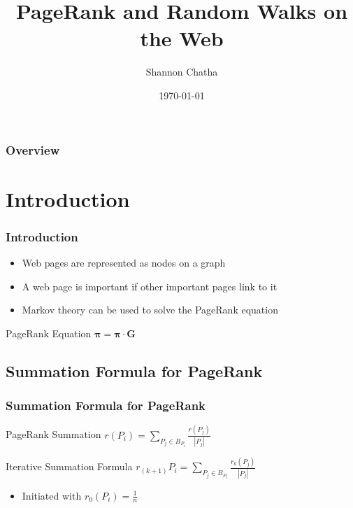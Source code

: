\documentclass{beamer}
\title[PageRank]{PageRank and Random Walks on the Web}
\author{Shannon Chatha}
\date{\today}
\begin{document}
\begin{frame}
\titlepage
\end{frame}
\begin{frame}
\frametitle{Overview}
\tableofcontents
\end{frame}


\section{Introduction}

\begin{frame}
\frametitle{Introduction}
\begin{itemize}
\item Web pages are represented as nodes on a graph
\item A web page is important if other important pages link to it
\item Markov theory can be used to solve the PageRank equation
\end{itemize}
\begin{block}{PageRank Equation}
$\boldsymbol{\pi} = \boldsymbol{\pi} \cdot \textbf{G}$
\end{block}
\end{frame}
\subsection{Summation Formula for PageRank}
\begin{frame}
\frametitle{Summation Formula for PageRank}
\begin{block}{PageRank Summation}
$r(P_i) = \displaystyle \sum_{P_j\in B_{P_i }} \frac{r(P_j)}{|P_j|} $
\end{block}
\begin{block}{Iterative Summation Formula}
$r_{(k+1)}P_i = \displaystyle \sum_{P_j\in B_{P_i }}\frac{r_k(P_j)}{|P_j|}$
\end{block}
\begin{itemize}
\item Initiated with \(r_0(P_i) = \frac{1}{n}\)
\end{itemize}
\end{frame}
\end{document}
